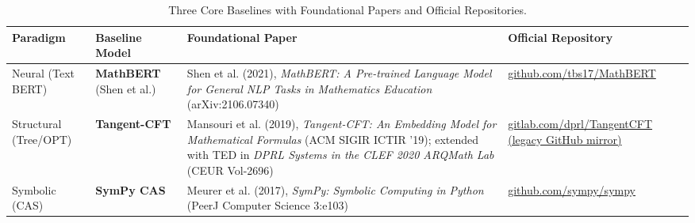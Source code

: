﻿\documentclass[11pt,a4paper]{article}
\begin{document}
	\begin{table}[H]
		\centering
		\small
		\caption{Three Core Baselines with Foundational Papers and Official Repositories.}
		\label{tab:baselines}
		\begin{tabularx}{\textwidth}{p{2.6cm} p{2.4cm} X p{4.3cm}}
			\toprule
			\textbf{Paradigm} & \textbf{Baseline Model} & \textbf{Foundational Paper} & \textbf{Official Repository} \\
			\midrule
			Neural (Text BERT) & \textbf{MathBERT} (Shen et al.) & Shen et al. (2021), \textit{MathBERT: A Pre-trained Language Model for General NLP Tasks in Mathematics Education} (arXiv:2106.07340) & \href{https://github.com/tbs17/MathBERT}{\small github.com/tbs17/MathBERT} \\
			\addlinespace[4pt]
			Structural (Tree/OPT) & \textbf{Tangent-CFT} & Mansouri et al. (2019), \textit{Tangent-CFT: An Embedding Model for Mathematical Formulas} (ACM SIGIR ICTIR '19); extended with TED in \textit{DPRL Systems in the CLEF 2020 ARQMath Lab} (CEUR Vol-2696) & \href{https://gitlab.com/dprl/TangentCFT}{\small gitlab.com/dprl/TangentCFT} \newline \href{https://github.com/BehroozMansouri/TangentCFT}{\small (legacy GitHub mirror)} \\
			\addlinespace[4pt]
			Symbolic (CAS) & \textbf{SymPy CAS} & Meurer et al. (2017), \textit{SymPy: Symbolic Computing in Python} (PeerJ Computer Science 3:e103) & \href{https://github.com/sympy/sympy}{\small github.com/sympy/sympy} \\
			\bottomrule
		\end{tabularx}
	\end{table}
\end{document}
